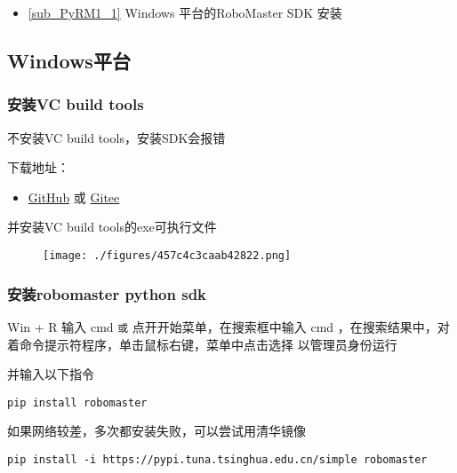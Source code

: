
\begin{issues}
\issueTODO
\end{issues}

\begin{itemize}
\item \autoref{sub_PyRM1_1} Windows 平台的RoboMaster SDK 安装
\end{itemize}

\subsection{Windows平台}\label{sub_PyRM1_1}
\subsubsection{安装VC build tools}
不安装VC build tools，安装SDK会报错

下载地址：\begin{itemize}
\item \href{https://github.com/dji-sdk/robomaster-sdk}{GitHub} 或 \href{https://gitee.com/xitinglin/RoboMaster-SDK}{Gitee}
\end{itemize}

并安装VC build tools的exe可执行文件

\begin{figure}[ht]
\centering
\texttt{[image: ./figures/457c4c3caab42822.png]}
\caption{} \label{fig_PyRM1_1}
\end{figure}

\subsubsection{安装robomaster python sdk}
Win + R 输入 cmd 
\verb|或|
点开开始菜单，在搜索框中输入 cmd ，在搜索结果中，对着命令提示符程序，单击鼠标右键，菜单中点击选择 以管理员身份运行 

并输入以下指令

\begin{lstlisting}[language=pythonC]
pip install robomaster
\end{lstlisting}

如果网络较差，多次都安装失败，可以尝试用清华镜像

\begin{lstlisting}[language=pythonC]
pip install -i https://pypi.tuna.tsinghua.edu.cn/simple robomaster
\end{lstlisting}

